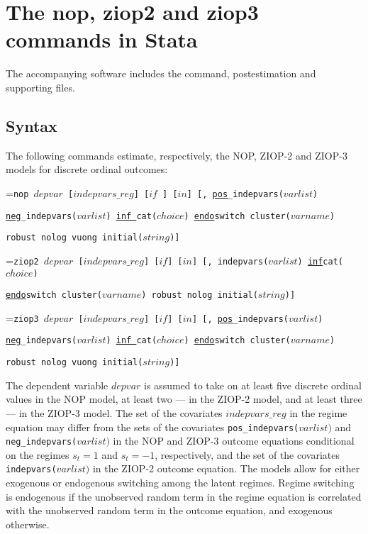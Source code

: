 \documentclass[letterpaper,fleqn,12pt]{article}
\begin{document}
\section{The nop, ziop2 and ziop3 commands in Stata}

The accompanying software includes the command, postestimation and
supporting files.

\subsection{Syntax}

The following commands estimate, respectively, the NOP, ZIOP-2 and ZIOP-3
models for discrete ordinal outcomes:

\medskip

\hangindent=\parindent\noindent \texttt{nop $depvar$ [$indepvars\_reg$] [$if$%
] [$in$] [, \underline{\texttt{pos}}\_indepvars($varlist$) }

\texttt{\underline{\texttt{neg}}\_indepvars($varlist$) \underline{\texttt{inf%
}}cat($choice$) }\underline{\texttt{endo}}\texttt{switch cluster($varname$) }

\texttt{robust nolog vuong initial($string$)] }

\hangindent=\parindent\noindent \texttt{ziop2 $depvar$ [$indepvars\_reg$] [$%
if$] [$in$] [, indepvars($varlist$) \underline{\texttt{inf}}cat($choice$)}

\texttt{\underline{\texttt{endo}}switch cluster($varname$) robust nolog
initial($string$)] }

\hangindent=\parindent\noindent \texttt{ziop3 $depvar$ [$indepvars\_reg$] [$%
if$] [$in$] [, \underline{\texttt{pos}}\_indepvars($varlist$)}

\texttt{\underline{\texttt{neg}}\_indepvars($varlist$) \underline{\texttt{inf%
}}cat($choice$) \underline{\texttt{endo}}switch cluster($varname$) }

\texttt{robust nolog vuong initial($string$)]}

\medskip

The dependent variable \texttt{$depvar$} is assumed to take on at least five
discrete ordinal values in the NOP model, at least two --- in the ZIOP-2
model, and at least three --- in the ZIOP-3 model. The set of the covariates 
\texttt{$indepvars\_reg$} in the regime equation may differ from the sets of
the covariates \texttt{\texttt{pos}\_indepvars($varlist)$} and \texttt{%
\texttt{neg}\_indepvars($varlist)$} in the NOP and ZIOP-3 outcome equations
conditional on the regimes $s_{t}=1$ and $s_{t}=-1$, respectively, and the
set of the covariates \texttt{indepvars($varlist)$} in the ZIOP-2 outcome
equation. The models allow for either exogenous or endogenous switching
among the latent regimes. Regime switching is endogenous if the unobserved
random term in the regime equation is correlated with the unobserved random
term in the outcome equation, and exogenous otherwise.
\end{document}
